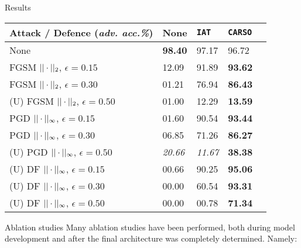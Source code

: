 {\begin{frame}{ Results}
        \centering
        \begin{tabular}{@{}lllll@{}}
            \toprule
            Attack / Defence (\textit{adv. acc.\%})            & None           & \texttt{IAT}   & \texttt{CARSO} &   \\
            \midrule
            None                                               & \textbf{98.40} & 97.17          & 96.72          &   \\
            \midrule
            FGSM $||\cdot||_2$, $\epsilon=0.15$           & 12.09          & 91.89          & \textbf{93.62} &   \\
            FGSM $||\cdot||_2$, $\epsilon=0.30$           & 01.21          & 76.94          & \textbf{86.43} &   \\
            \midrule
            (U) FGSM $||\cdot||_2$, $\epsilon=0.50$       & 01.00          & 12.29          & \textbf{13.59} &   \\
            \midrule
            PGD $||\cdot||_{\infty}$, $\epsilon=0.15$     & 01.60          & 90.54          & \textbf{93.44} &   \\
            PGD $||\cdot||_{\infty}$, $\epsilon=0.30$     & 06.85          & 71.26          & \textbf{86.27} &   \\
            \midrule
            (U) PGD $||\cdot||_{\infty}$, $\epsilon=0.50$ & \textit{20.66} & \textit{11.67} & \textbf{38.38} &   \\
            \midrule
            (U) DF $||\cdot||_{\infty}$, $\epsilon=0.15$  & 00.66          & 90.25          & \textbf{95.06} &   \\
            (U) DF $||\cdot||_{\infty}$, $\epsilon=0.30$  & 00.00          & 60.54          & \textbf{93.31} &   \\
            (U) DF $||\cdot||_{\infty}$, $\epsilon=0.50$  & 00.00          & 00.78          & \textbf{71.34} &   \\ \bottomrule
        \end{tabular}
    \end{frame}

    \begin{frame}{ Ablation studies}
    Many \alert{ablation studies} have been performed, both during model development and after the final architecture was completely determined. Namely:


\end{frame}}
